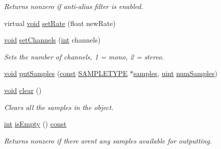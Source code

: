 \begin{DoxyCompactItemize}
\begin{DoxyCompactList}\small\item\em Returns nonzero if anti-\/alias filter is enabled. \end{DoxyCompactList}\item 
virtual \hyperlink{sound_8c_ae35f5844602719cf66324f4de2a658b3}{void} \hyperlink{classsoundtouch_1_1_rate_transposer_a1cc7dfb35ba63967b8bd091a01d35491}{set\+Rate} (float new\+Rate)
\item 
\hyperlink{sound_8c_ae35f5844602719cf66324f4de2a658b3}{void} \hyperlink{classsoundtouch_1_1_rate_transposer_a7208a7430059d5928867f7ab03477b95}{set\+Channels} (\hyperlink{xmltok_8h_a5a0d4a5641ce434f1d23533f2b2e6653}{int} channels)
\begin{DoxyCompactList}\small\item\em Sets the number of channels, 1 = mono, 2 = stereo. \end{DoxyCompactList}\item 
\hyperlink{sound_8c_ae35f5844602719cf66324f4de2a658b3}{void} \hyperlink{classsoundtouch_1_1_rate_transposer_a83b2a84ab227d5c5bc432db3760a0fb1}{put\+Samples} (\hyperlink{getopt1_8c_a2c212835823e3c54a8ab6d95c652660e}{const} \hyperlink{namespacesoundtouch_a97cfd29a7abb4d4b2a72f803d5b5850c}{S\+A\+M\+P\+L\+E\+T\+Y\+PE} $\ast$\hyperlink{test__w__saw8_8c_a54185623a5a093f671a73e5fba6197a1}{samples}, \hyperlink{_s_t_types_8h_a91ad9478d81a7aaf2593e8d9c3d06a14}{uint} \hyperlink{classsoundtouch_1_1_f_i_f_o_processor_a254a8506a4a93083c0e914aff361c674}{num\+Samples})
\item 
\hyperlink{sound_8c_ae35f5844602719cf66324f4de2a658b3}{void} \hyperlink{classsoundtouch_1_1_rate_transposer_a2c4fe6403befd420e58542fe4c8f5711}{clear} ()
\begin{DoxyCompactList}\small\item\em Clears all the samples in the object. \end{DoxyCompactList}\item 
\hyperlink{xmltok_8h_a5a0d4a5641ce434f1d23533f2b2e6653}{int} \hyperlink{classsoundtouch_1_1_rate_transposer_a51952353d6c773c9ec08e62dd0f8747a}{is\+Empty} () \hyperlink{getopt1_8c_a2c212835823e3c54a8ab6d95c652660e}{const} 
\begin{DoxyCompactList}\small\item\em Returns nonzero if there aren\textquotesingle{}t any samples available for outputting. \end{DoxyCompactList}\end{DoxyCompactItemize}
